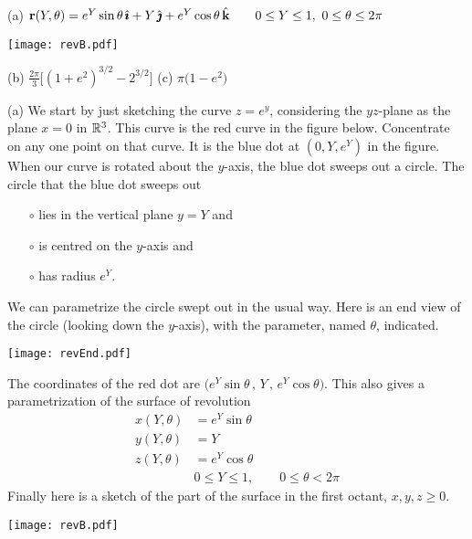 
\begin{answer} 
(a) $
\mathbf{r}(Y,\theta) = e^Y\sin\theta\,\hat{\pmb{\imath}} + Y\,\hat{\pmb{\jmath}} +e^Y\cos\theta\,\hat{\mathbf{k}}\qquad
0\le Y\le 1,\ 0\le\theta\le 2\pi
$

\begin{center}
    \texttt{[image: revB.pdf]}
\end{center}

(b) $\frac{2\pi}{3}\Big[(1+e^2)^{3/2}-2^{3/2}\Big]$\qquad
(c) $\pi\big(1-e^2\big)$
\end{answer}

\begin{solution} (a)
We start by just sketching the curve $z=e^y$, considering the $yz$-plane as 
the plane $x=0$ in $\mathbb{R}^3$. This curve is the red curve 
in the figure below.
Concentrate on any one point on that curve. It is the blue dot at $(0,Y,e^Y)$
in the figure. When our curve is rotated about the $y$-axis, the blue dot
sweeps out a circle. The circle that the blue dot sweeps out
\begin{itemize}\itemsep1pt \parskip0pt  %
\item[$\circ$]
lies in the vertical plane $y=Y$ and
\item[$\circ$]
is centred on the $y$-axis and
\item[$\circ$]
has radius $e^Y$.
\end{itemize}
We can parametrize the circle swept out in the usual way. Here
is an end view of the circle (looking down the $y$-axis), with 
the parameter, named $\theta$, indicated. 
\begin{center}
    \texttt{[image: revEnd.pdf]}
\end{center}
The coordinates of the red dot are $\big(e^Y\sin\theta\,,\,Y\,,\,e^Y\cos\theta\big)$. This also gives 
a parametrization of the surface of revolution
\begin{align*}
x(Y,\theta) & = e^Y\sin\theta \\
y(Y,\theta) & = Y \\
z(Y,\theta) & = e^Y\cos\theta \\
&0\le Y\le 1,\qquad 0\le\theta<2\pi
\end{align*}
Finally here is a sketch of the part of the surface in the first octant,
$x,y,z\ge 0$.
\begin{center}
    \texttt{[image: revB.pdf]}
\end{center}


\end{solution}
